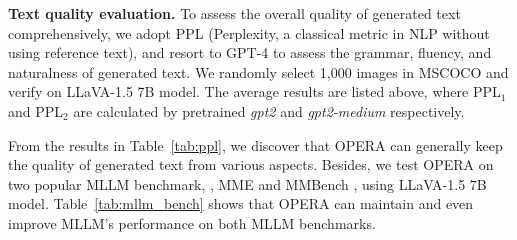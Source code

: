 \documentclass[10pt,twocolumn,letterpaper]{article}
\newcommand{\Tref}[1]{Table~\ref{#1}}
\begin{document}
\noindent\textbf{Text quality evaluation.} 
To assess the overall quality of generated text comprehensively, we adopt PPL (Perplexity, a classical metric in NLP without using reference text), and resort to GPT-4 to assess the grammar, fluency, and naturalness of generated text. 
We randomly select 1,000 images in MSCOCO and verify on LLaVA-1.5 7B model. 
The average results are listed above, where PPL$_1$ and PPL$_2$ are calculated by pretrained \textit{gpt2} and \textit{gpt2-medium} respectively.

From the results in \Tref{tab:ppl}, we discover that OPERA can generally keep the quality of generated text from various aspects.
Besides, we test OPERA on two popular MLLM benchmark, \ie, MME \cite{fu2023mme} and MMBench \cite{liu2023mmbench}, using LLaVA-1.5 7B model. \Tref{tab:mllm_bench} shows that OPERA can maintain and even improve MLLM's performance on both MLLM benchmarks.
\end{document}
